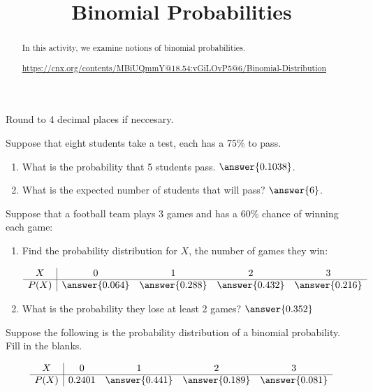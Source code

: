 \documentclass{ximera}
\title{Binomial Probabilities}
\begin{document}
      
\begin{abstract}
      
In this activity, we examine notions of binomial probabilities.

\url{https://cnx.org/contents/MBiUQmmY@18.54:vGiLOvP5@6/Binomial-Distribution}

      
\end{abstract}
      
\maketitle
 

Round to 4 decimal places if neccesary.

\begin{problem}
Suppose that eight students take a test, each has a 75\% to pass.

\begin{enumerate}
\item What is the probability that 5 students pass.  $\answer{0.1038}$.
\item What is the expected number of students that will pass? $\answer{6}$.
\end{enumerate}


\end{problem}

\begin{problem}
Suppose that a football team plays 3 games and has a 60\% chance of winning each game:

\begin{enumerate}
\item Find the probability distribution for $X$, the number of games they win:

$$\begin{array}{c|cccc}
X & 0 & 1 & 2 & 3\\
\hline
P(X) & \answer{0.064} & \answer{0.288} & \answer{0.432} & \answer{0.216}
\end{array}
$$

\item What is the probability they lose at least 2 games?  $\answer{0.352}$


\end{enumerate}

\end{problem}


\begin{problem}
Suppose the following is the probability distribution of a binomial probability.  Fill in the blanks.


$$\begin{array}{c|cccc}
X & 0 & 1 & 2 & 3\\
\hline
P(X) & 0.2401 & \answer{0.441} & \answer{0.189} & \answer{0.081}
\end{array}
$$


\end{problem}
\end{document}
